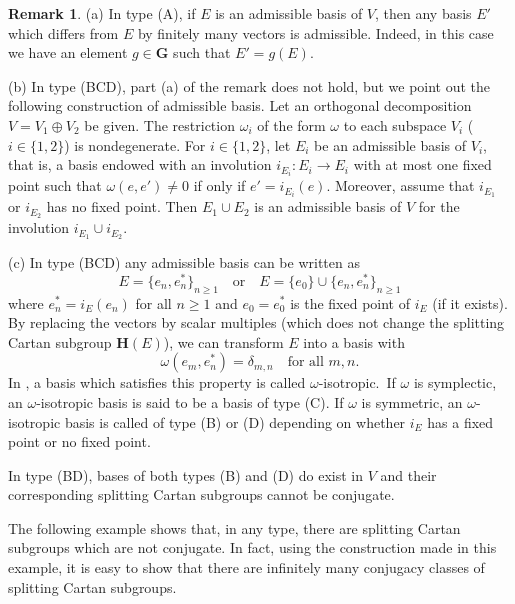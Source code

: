 \documentclass[12pt]{amsart}
\newcommand{\G}{\mathbf{G}}
\renewcommand{\H}{\mathbf{H}}
\numberwithin{equation}{section}
\theoremstyle{definition}
\newtheorem{remark}[theorem]{Remark}
\begin{document}
\begin{remark}
\label{R2.2}
{\rm (a)} In type (A), if $E$ is an admissible basis of $V$, then any basis $E'$ which differs from $E$ by finitely many vectors is admissible.
Indeed, in this case we have an element $g\in\G$ such that $E'=g(E)$.

{\rm (b)} In type (BCD), part (a) of the remark does not hold, but we point out the following construction of admissible basis.
Let an orthogonal decomposition $V=V_1\oplus V_2$ be given.
The restriction $\omega_i$ of the form $\omega$ to each subspace $V_i$ ($i\in\{1,2\}$) is nondegenerate. For $i\in\{1,2\}$, let $E_i$ be an admissible basis of $V_i$, that is,
a basis endowed with an involution $i_{E_i}:E_i\to E_i$ with at most one fixed point such that $\omega(e,e')\not=0$ if only if $e'=i_{E_i}(e)$.
Moreover, assume that $i_{E_1}$ or $i_{E_2}$ has no fixed point. Then $E_1\cup E_2$ is an admissible basis of $V$ for the involution $i_{E_1}\cup i_{E_2}$.

{\rm (c)} In type (BCD) any admissible basis can be written as
\[E=\{e_n,e_n^*\}_{n\geq 1}
\quad\mbox{or}\quad
E=\{e_0\}\cup\{e_n,e_n^*\}_{n\geq 1}\]
where $e_n^*=i_E(e_n)$ for all $n\geq 1$ and $e_0=e_0^*$ is the fixed point of $i_E$ (if it exists).
By replacing the vectors by scalar multiples (which does not change the splitting Cartan subgroup $\H(E)$), we can transform $E$ into a basis with
\[\omega(e_m,e_n^*)=\delta_{m,n}\quad\mbox{for all $m,n$}.\]
In \cite{Dimitrov-Penkov}, a basis which satisfies this property is called $\omega$-isotropic.\ If $\omega$ is symplectic, an $\omega$-isotropic basis is said to be a basis of type (C). If $\omega$ is symmetric, an $\omega$-isotropic basis is called of type (B) or (D) depending on whether $i_E$ has a fixed point or no fixed point. 

In type (BD), bases of both types (B) and (D) do exist in $V$ and their corresponding splitting Cartan subgroups cannot be conjugate.
\end{remark}



The following example shows that, in any type, there are splitting Cartan subgroups which are not conjugate. In fact, using the construction made in this example, it is easy to show that there are infinitely many conjugacy classes of splitting Cartan subgroups.
\end{document}
